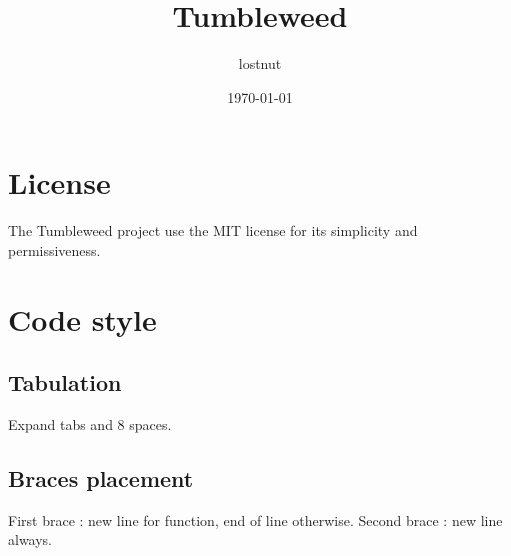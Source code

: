 

\title{Tumbleweed}
\author{lostnut}
\date{\today}


\maketitle
\tableofcontents

\section{License}%
\label{sec:license}

The Tumbleweed project use the MIT license for its simplicity and permissiveness.

\section{Code style}%
\label{sec:code_style}

\subsection{Tabulation}%
\label{sub:tabulation}

Expand tabs and 8 spaces.

\subsection{Braces placement}%
\label{sub:braces_placement}

First brace : new line for function, end of line otherwise.
Second brace : new line always.

